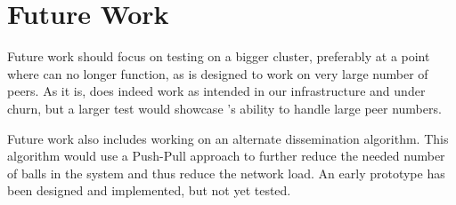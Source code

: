 \section{Future Work}
\label{sec:future-work}
Future work should focus on testing \epto on a bigger cluster, preferably at a point where \jgroups can no longer function, as \epto is designed to work on very large number of peers. As it is, \epto does indeed work as intended in our infrastructure and under churn, but a larger test would showcase \epto's ability to handle large peer numbers.
\par
Future work also includes working on an alternate \epto dissemination algorithm. This algorithm would use a Push-Pull approach to further reduce the needed number of balls in the system and thus reduce the network load. An early prototype has been designed and implemented, but not yet tested.